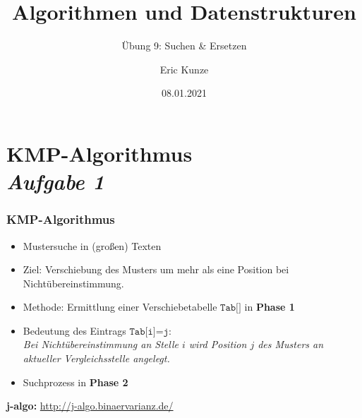 \documentclass{beamer}
\begin{document}
	
	\title{Algorithmen und Datenstrukturen}
	\subtitle{Übung 9: Suchen \& Ersetzen}
	\author{Eric Kunze}
	\date{08.01.2021}

	\maketitle



\section{KMP-Algorithmus \\ \textit{Aufgabe 1}} 

\begin{frame} \frametitle{KMP-Algorithmus}
	\begin{itemize}
		\item Mustersuche in (großen) Texten
		\item Ziel: Verschiebung des Musters um mehr als eine Position bei Nichtübereinstimmung.
		\item Methode: Ermittlung einer Verschiebetabelle {\large $\texttt{Tab[]}$} in \textbf{Phase 1}
		\item Bedeutung des Eintrags {\large $\texttt{Tab[i]=j}$}: \\
		\textit{Bei Nichtübereinstimmung an Stelle $i$ wird Position $j$ des Musters an aktueller Vergleichsstelle angelegt.}
		\item Suchprozess in \textbf{Phase 2}
	\end{itemize}

	\textbf{j-algo:} \url{http://j-algo.binaervarianz.de/}
\end{frame}
\end{document}

